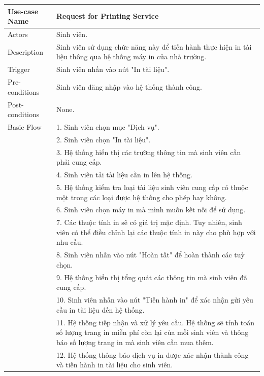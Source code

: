 \begin{enumerate}[a)]
    \begin{longtable}{|l|p{10cm}|}
        \hline
        \endhead
        \hline
        \endfoot
        Use-case Name & \textbf{Request for Printing Service}\\
        \hline
        Actors & Sinh viên.\\
        \hline
        Description & Sinh viên sử dụng chức năng này để tiến hành thực hiện in tài liệu thông qua hệ thống máy in của nhà trường.\\
        \hline
        Trigger & Sinh viên nhấn vào nút "In tài liệu".\\
        \hline
        Pre-conditions & Sinh viên đăng nhập vào hệ thống thành công.\\
        \hline
        Post-conditions & None.\\
        \hline
        Basic Flow & 1. Sinh viên chọn mục "Dịch vụ".\\
        & 2. Sinh viên chọn "In tài liệu".\\
        & 3. Hệ thống hiển thị các trường thông tin mà sinh viên cần phải cung cấp.\\
        & 4. Sinh viên tải tài liệu cần in lên hệ thống.\\
        & 5. Hệ thống kiểm tra loại tài liệu sinh viên cung cấp có thuộc một trong các loại được hệ thống cho phép hay không.\\
        & 6. Sinh viên chọn máy in mà mình muốn kết nối để sử dụng.\\
        & 7. Các thuộc tính in sẽ có giá trị mặc định. Tuy nhiên, sinh viên có thể điều chỉnh lại các thuộc tính in này cho phù hợp với nhu cầu.\\
        & 8. Sinh viên nhấn vào nút "Hoàn tất" để hoàn thành các tuỳ chọn.\\
        & 9. Hệ thống hiển thị tổng quát các thông tin mà sinh viên đã cung cấp.\\
        & 10. Sinh viên nhấn vào nút "Tiến hành in" để xác nhận gửi yêu cầu in tài liệu đến hệ thống.\\
        & 11. Hệ thống tiếp nhận và xử lý yêu cầu. Hệ thống sẽ tính toán số lượng trang in miễn phí còn lại của mỗi sinh viên và thông báo số lượng trang in mà sinh viên cần mua thêm.\\ 
        & 12. Hệ thống thông báo dịch vụ in được xác nhận thành công và tiến hành in tài liệu cho sinh viên.\\


\end{longtable}
\end{enumerate}
